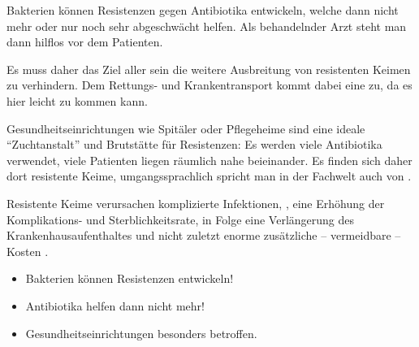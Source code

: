 {%
Bakterien können Resistenzen
gegen Antibiotika entwickeln, welche dann nicht mehr oder nur noch sehr
abgeschwächt helfen. Als behandelnder Arzt steht man dann hilflos vor dem
Patienten.

Es muss daher das Ziel aller sein die weitere Ausbreitung
von resistenten Keimen zu verhindern. Dem Rettungs- und Krankentransport kommt dabei eine
 zu, da es hier leicht zu
 kommen kann.



Gesundheitseinrichtungen wie Spitäler oder Pflegeheime sind eine ideale
"`Zuchtanstalt"' und Brutstätte für Resistenzen: Es werden viele Antibiotika
verwendet, viele Patienten liegen räumlich nahe beieinander. Es finden sich
daher dort  resistente Keime, umgangssprachlich spricht man in der
Fachwelt auch von . 

Resistente Keime verursachen komplizierte Infektionen, , eine Erhöhung der Komplikations- und
Sterblichkeitsrate, in Folge eine Verlängerung des Krankenhausaufenthaltes und
nicht zuletzt enorme zusätzliche -- vermeidbare -- Kosten \cite{Kucera2010}.
}{
\begin{itemize}
   \item Bakterien können Resistenzen entwickeln!
   \item Antibiotika helfen dann nicht mehr!
   \item Gesundheitseinrichtungen besonders betroffen.
\end{itemize}
}
{}
{}
{}


